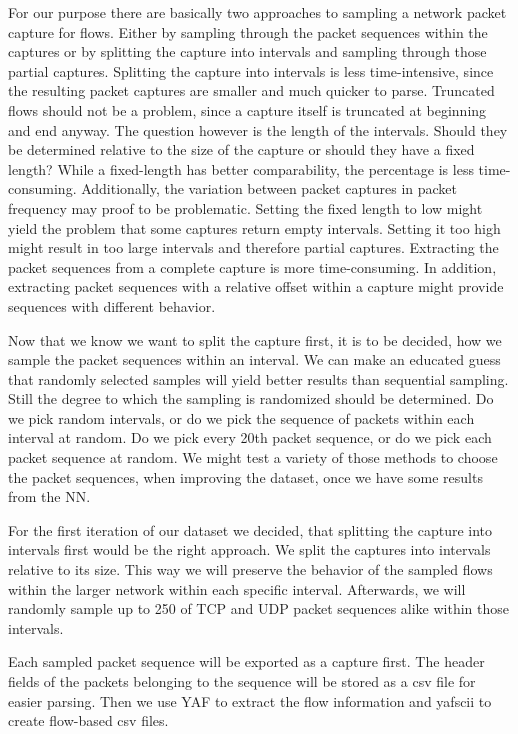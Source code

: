 \documentclass[
	ngerman,
	ruledheaders=section,%
	class=report,%
	thesis={type=bachelor},%
	accentcolor=9c,%
	custommargins=true,%
	marginpar=false,%
	parskip=half-,%
	fontsize=11pt,%
]{tudapub}
\begin{document}
For our purpose there are basically two approaches to sampling a network packet capture for flows.
Either by sampling through the packet sequences within the captures or by splitting the capture into intervals and sampling through those partial captures.
Splitting the capture into intervals is less time-intensive, since the resulting packet captures are smaller and much quicker to parse.
Truncated flows should not be a problem, since a capture itself is truncated at beginning and end anyway.
The question however is the length of the intervals.
Should they be determined relative to the size of the capture or should they have a fixed length?
While a fixed-length has better comparability, the percentage is less time-consuming.
Additionally, the variation between packet captures in packet frequency may proof to be problematic.
Setting the fixed length to low might yield the problem that some captures return empty intervals.
Setting it too high might result in too large intervals and therefore partial captures.
Extracting the packet sequences from a complete capture is more time-consuming.
In addition, extracting packet sequences with a relative offset within a capture might provide sequences with different behavior.

Now that we know we want to split the capture first, it is to be decided, how we sample the packet sequences within an interval.
We can make an educated guess that randomly selected samples will yield better results than sequential sampling.
Still the degree to which the sampling is randomized should be determined.
Do we pick random intervals, or do we pick the sequence of packets within each interval at random.
Do we pick every 20th packet sequence, or do we pick each packet sequence at random.
We might test a variety of those methods to choose the packet sequences, when improving the dataset, once we have some results from the NN.

For the first iteration of our dataset we decided, that splitting the capture into intervals first would be the right approach.
We split the captures into intervals relative to its size.
This way we will preserve the behavior of the sampled flows within the larger network within each specific interval.
Afterwards, we will randomly sample up to 250 of TCP and UDP packet sequences alike within those intervals.

Each sampled packet sequence will be exported as a capture first.
The header fields of the packets belonging to the sequence will be stored as a csv file for easier parsing.
Then we use YAF to extract the flow information and yafscii to create flow-based csv files.
\end{document}
